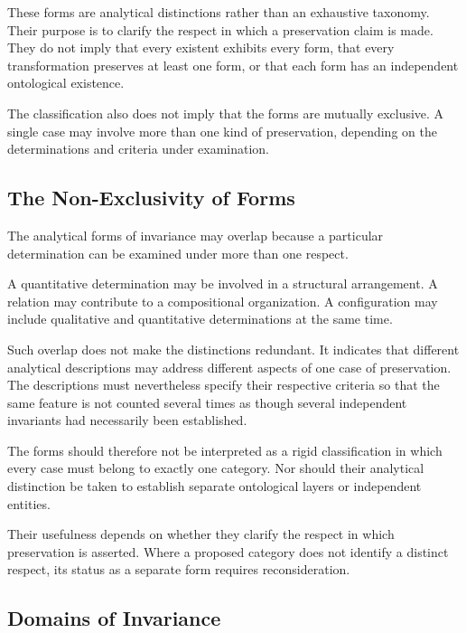 These forms are analytical distinctions rather than an
exhaustive taxonomy. Their purpose is to clarify the respect
in which a preservation claim is made. They do not imply
that every existent exhibits every form, that every
transformation preserves at least one form, or that each
form has an independent ontological existence.

The classification also does not imply that the forms
are mutually exclusive. A single case may involve more
than one kind of preservation, depending on the determinations
and criteria under examination.





\subsection{The Non-Exclusivity of Forms}

The analytical forms of invariance may overlap because
a particular determination can be examined under more
than one respect.

A quantitative determination may be involved in a
structural arrangement. A relation may contribute to
a compositional organization. A configuration may
include qualitative and quantitative determinations
at the same time.

Such overlap does not make the distinctions redundant.
It indicates that different analytical descriptions
may address different aspects of one case of preservation.
The descriptions must nevertheless specify their respective
criteria so that the same feature is not counted several
times as though several independent invariants had
necessarily been established.

The forms should therefore not be interpreted as a
rigid classification in which every case must belong
to exactly one category. Nor should their analytical
distinction be taken to establish separate ontological
layers or independent entities.

Their usefulness depends on whether they clarify the
respect in which preservation is asserted. Where a
proposed category does not identify a distinct respect,
its status as a separate form requires reconsideration.

\subsection{Domains of Invariance}

